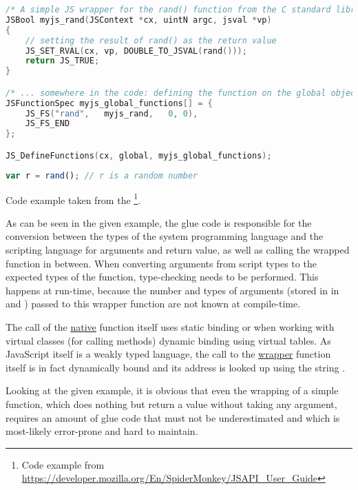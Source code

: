 \SingleSpacing
\begin{lstlisting}[language=C++, caption=Exposing a \myProperName{C} function to \myProperName{SpiderMonkey}]
/* A simple JS wrapper for the rand() function from the C standard library */
JSBool myjs_rand(JSContext *cx, uintN argc, jsval *vp)
{
    // setting the result of rand() as the return value
    JS_SET_RVAL(cx, vp, DOUBLE_TO_JSVAL(rand()));
    return JS_TRUE;
}

/* ... somewhere in the code: defining the function on the global object so it can be used from the script */
JSFunctionSpec myjs_global_functions[] = {
    JS_FS("rand",   myjs_rand,   0, 0),
    JS_FS_END
};

JS_DefineFunctions(cx, global, myjs_global_functions);
\end{lstlisting}
\OnehalfSpacing

\SingleSpacing
\begin{lstlisting}[language=JavaScript, caption=Using a \myProperName{C} function from \myProperName{SpiderMonkey}]
var r = rand();	// r is a random number
\end{lstlisting}
\OnehalfSpacing

Code example taken from the \footnote{Code example from \url{https://developer.mozilla.org/En/SpiderMonkey/JSAPI_User_Guide}}.

As can be seen in the given example, the glue code is responsible for the conversion between the types of the system programming language and the scripting language for arguments and return value, as well as calling the wrapped function in between. When converting arguments from script types to the expected types of the function, type-checking needs to be performed. This happens at run-time, because the number and types of arguments (stored in in  and ) passed to this wrapper function are not known at compile-time.

The call of the \underline{native} function  itself uses static binding or when working with virtual classes (for calling methods) dynamic binding using virtual tables. As JavaScript itself is a weakly typed language, the call to the \underline{wrapper} function  itself is in fact dynamically bound and its address is looked up using the string .

Looking at the given example, it is obvious that even the wrapping of a simple  function, which does nothing but return a  value without taking any argument, requires an amount of glue code that must not be underestimated and which is most-likely error-prone and hard to maintain.

